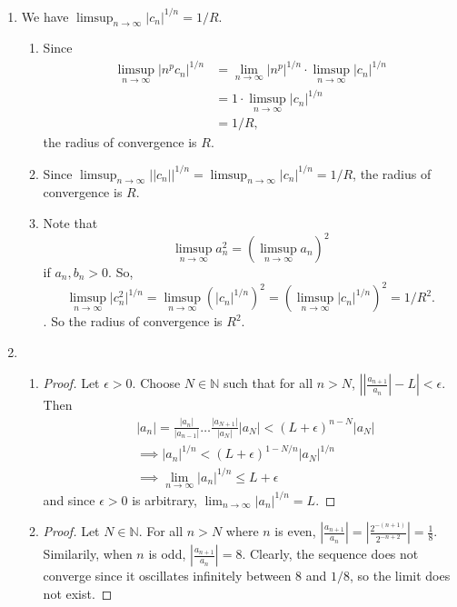 \documentclass[11pt, letterpaper]{article}
\begin{document}
\begin{enumerate}
  \item We have $\limsup_{n \to \infty} \vert c_n \vert^{1/n} = 1/R$.
    \begin{enumerate}
      \item Since \begin{align*}
        \limsup_{n \to \infty} \vert n^p c_n \vert^{1/n}
        &= \lim_{n \to \infty} \vert n^p \vert^{1/n} \cdot \limsup_{n \to \infty} \vert c_n \vert^{1/n} \\
        &= 1 \cdot \limsup_{n \to \infty} \vert c_n \vert^{1/n} \\
        &= 1/R,
      \end{align*} the radius of convergence is $R$.
      \item Since $\limsup_{n \to \infty} \vert \vert c_n \vert \vert^{1/n} = \limsup_{n \to \infty} \vert c_n \vert^{1/n} = 1/R$, the radius of convergence is $R$.
      \item Note that 
      $$
        \limsup_{n \to \infty} a_n^2 = \left(\limsup_{n \to \infty} a_n\right)^2
      $$
      if $a_n, b_n > 0$. So,
      $$
      \limsup_{n \to \infty} \vert c_n^2 \vert^{1/n} = \limsup_{n \to \infty} \left(\vert c_n \vert^{1/n}\right)^2 = \left(\limsup_{n \to \infty} \vert c_n \vert^{1/n}\right)^2 = 1/R^2.
      $$. So the radius of convergence is $R^2$. 
    \end{enumerate}
  

  \item \begin{enumerate}
    \item \begin{proof}
      Let $\epsilon > 0$. Choose $N \in \mathbb N$ such that for all $n > N$, $\left\vert \left\vert \frac{a_{n + 1}}{a_n} \right\vert - L \right\vert < \epsilon$. Then
      \begin{align*}
        &\vert a_n \vert = \frac{\vert a_n \vert}{\vert a_{n - 1} \vert}\dots\frac{\vert a_{N + 1}\vert }{\vert a_N\vert} \vert a_N \vert < (L + \epsilon)^{n - N} \vert a_N \vert \\
        &\implies \vert a_n \vert^{1/n} < (L + \epsilon)^{1 - N/n} \vert a_N \vert^{1/n} \\
        &\implies \lim_{n \to \infty} \vert a_n \vert^{1/n} \leq L + \epsilon
      \end{align*}
      and since $\epsilon > 0$ is arbitrary, $\lim_{n \to \infty} \vert a_n \vert^{1/n} = L$.
    \end{proof}

    \item \begin{proof}
      Let $N \in \mathbb N$. For all $n > N$ where $n$ is even, $\left\vert \frac{a_{n + 1}}{a_n} \right\vert = \left\vert \frac{2^{-(n + 1)}}{2^{-n + 2}} \right\vert = \frac{1}{8}$. Similarily, when $n$ is odd, $\left\vert \frac{a_{n + 1}}{a_n} \right\vert = 8$. Clearly, the sequence does not converge since it oscillates infinitely between $8$ and $1/8$, so the limit does not exist.


\end{proof}
\end{enumerate}
\end{enumerate}
\end{document}
